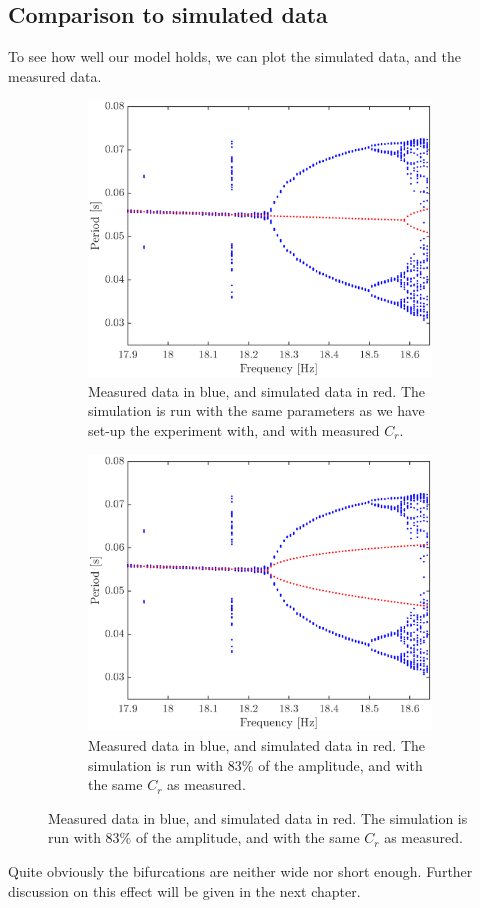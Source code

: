 \documentclass[12pt,oneside,a4paper]{article}
\numberwithin{equation}{section}
\begin{document}
{{{{\subsection{Comparison to simulated data}
To see how well our model holds, we can plot the simulated data, and the measured data.
\begin{figure}
\centering
\begin{subfigure}[t]{0.49\textwidth}
	\centering
	\includegraphics[width=\textwidth]{realvals}
	\caption{Measured data in blue, and simulated data in red. The simulation is run with the same parameters as we have set-up the experiment with, and with measured $C_r$.}
	\label{noball}
\end{subfigure}\hfill
\begin{subfigure}[t]{0.49\textwidth}
	\centering
	\includegraphics[width=\textwidth]{fakevals}
	\caption{Measured data in blue, and simulated data in red. The simulation is run with 83\% of the amplitude, and with the same $C_r$ as measured.}
	\label{wball}
\end{subfigure}
\end{figure}
Quite obviously the bifurcations are neither wide nor short enough. Further discussion on this effect will be given in the next chapter.
}}}}
\end{document}
